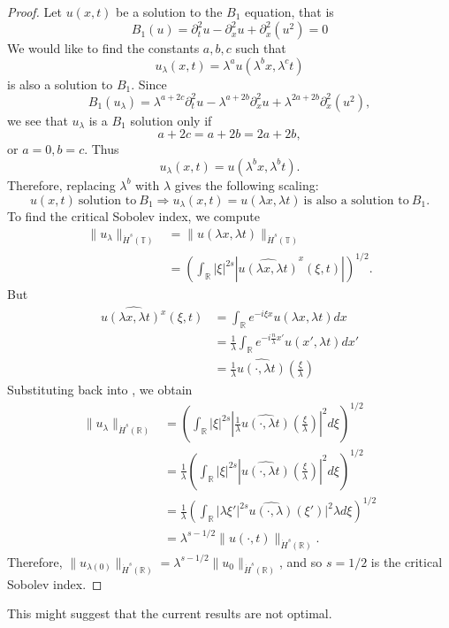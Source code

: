 \documentclass[12pt,reqno]{amsart}
\numberwithin{equation}{section}  %
\renewcommand{\cref}{\Cref}
\newcommand{\rr}{\mathbb{R}}
\newcommand{\ci}{\mathbb{T}}
\newcommand{\wh}{\widehat}
\begin{document}
\begin{proof}
Let $u(x, t)$ be a solution to the $B_1$ equation, that is
%
$$
B_1(u)=
 \partial_t^2u - \partial^2_x u + \partial_x^2(u^2)  = 0
$$
%
We would like to find the constants
$a, b, c$ such that
\[
u_\lambda (x, t) = \lambda^a u(\lambda^b x, \lambda^c t)
\]
is also a solution to $B_1$.  Since 
$$
B_1(u_\lambda)=
\lambda^{a+2c} \partial_t^2u 
-
 \lambda^{a+2b} \partial^2_x u 
 +
  \lambda^{2a+2b}
  \partial_x^2(u^2),  
$$
we see that $u_\lambda$ is a $B_1$ solution only if
$$
a+2c=a+2b=2a+2b,
$$
or
$
a=0, b=c.
$
  Thus
\[
u_\lambda (x, t) = u(\lambda^{b}x,  \lambda^{b} t).
\]
%
%
Therefore, replacing  $ \lambda^b$ with  $ \lambda$ gives the following scaling:
%
\begin{equation}
\label{B2-scal}
\boxed{u(x, t) \ \text{solution to} \  B_1
 \Longrightarrow 
u_\lambda (x, t) = u(\lambda x, \lambda t) \ \text{is also a
solution to} \  B_1. 
}
\end{equation}
\label{rem:scaling-B2}
To find the critical Sobolev index, we compute
%
%
\begin{equation}
\begin{split}
  \| u_{\lambda} \|_{\dot{H}^s(\ci)} 
  & =  \| u(\lambda x, \lambda t) \|_{\dot{H}^{s}(\ci)}
  \\
  & = \left( \int_{\rr} | \xi |^{2s} | \wh{u(\lambda x,
  \lambda t)}^x (\xi, t)| \right)^{1/2}.
\end{split}
\label{crit-ind-comp-B2}
\end{equation}
%
But
%
%
\begin{equation*}
\begin{split}
  \wh{u(\lambda x, \lambda t)^x}(\xi, t)
  & = \int_{\rr}e^{-i\xi x}u(\lambda x, \lambda t) dx
  \\
  & = \frac{1}{\lambda} \int_{\rr}e^{-i \frac{n}{\lambda} x'}u(x',
  \lambda t) dx'
  \\
  & = \frac{1}{\lambda} \wh{u(\cdot, \lambda t)}(\frac{\xi}{\lambda})
\end{split}
\end{equation*}
%
%
Substituting back into \cref{crit-ind-comp-B2}, we obtain
%
%
\begin{equation*}
\begin{split}
  \| u_{\lambda} \|_{\dot{H}^s(\rr)} 
  & = \left( \int_{\rr} | \xi |^{2s} |
  \frac{1}{\lambda}\wh{u(\cdot, \lambda t)}(\frac{\xi}{\lambda}) |^2 d \xi
  \right)^{1/2}
  \\
  & = \frac{1}{\lambda} \left( \int_{\rr}| \xi |^{2s} | \wh{u(\cdot,
  \lambda t)}(\frac{\xi}{\lambda}) |^2 d \xi  \right)^{1/2}
  \\
  & = \frac{1}{\lambda} \left( \int_{\rr} | \lambda \xi' |^{2s} 
  \wh{u(\cdot, \lambda)}(\xi') |^2 \lambda d \xi
  \right)^{1/2}
  \\
  & = \lambda^{s - 1/2} \|u(\cdot, t) \|_{\dot{H}^s (\rr)}.
\end{split}
\end{equation*}
%
%
Therefore, $\| u_{\lambda(0)} \|_{\dot{H}^s(\rr)} = \lambda^{s - 1/2} \|
u_{0} \|_{\dot{H}^{s}(\rr)}$, and so $s=1/2$ is the critical Sobolev index.
\end{proof}
This might suggest that the current results are not optimal.
%
%

%
\end{document}
